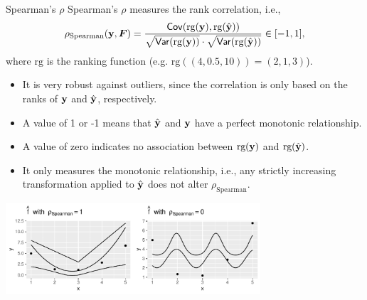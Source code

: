 \begin{vbframe}{Spearman's $\rho$}
\footnotesize
Spearman's $\rho$ measures the rank correlation, i.e.,
\[
\rho_{\text{Spearman}}(\mathbf{y}, \boldsymbol{F}) = \frac{\mathsf{Cov}(\textrm{rg}(\mathbf{y}),\textrm{rg}(\hat{\mathbf{y}}))}
{\sqrt{\mathsf{Var}(\textrm{rg}(\mathbf{y}))}\cdot\sqrt{\mathsf{Var}(\textrm{rg}(\hat{\mathbf{y}}))}}  \in [-1, 1],
\]
where $\textrm{rg}$ is the ranking function (e.g. $\textrm{rg}((4, 0.5, 10)) = 
(2, 1, 3)$).

\begin{itemize}
  \item It is very robust against outliers, since the correlation is only based 
  on the ranks of $\mathbf{y}$ and $\hat{\mathbf{y}}$, respectively.
  \item A value of 1 or -1 means that $\hat{\mathbf{y}}$ and $\mathbf{y}$ have a perfect monotonic 
  relationship.  
  \item A  value of zero indicates no association between 
  $\textrm{rg}(\mathbf{y})$ and $\textrm{rg}(\hat{\mathbf{y}})$.
  \item It only measures the monotonic relationship, i.e., any strictly
  increasing transformation applied to $\hat{\mathbf{y}}$ does not alter 
  $\rho_{\text{Spearman}}$.

\end{itemize}
\begin{center}
\includegraphics[width=0.71\textwidth]{figure/eval_spearman}
\end{center}
\end{vbframe}


